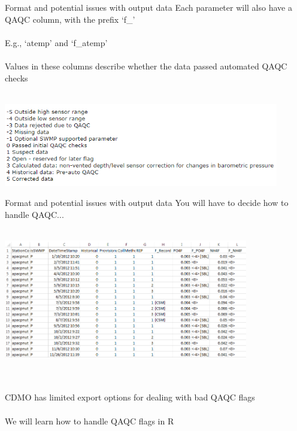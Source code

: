 \documentclass[xcolor=svgnames]{beamer}\usepackage[]{graphicx}\usepackage[]{color}
\begin{document}
\begin{frame}{Format and potential issues with output data}
Each parameter will also have a QAQC column, with the prefix `f\_' \\~\\
E.g., `atemp' and `f\_atemp' \\~\\
Values in these columns describe whether the data passed automated QAQC checks \\~\\
\centerline{\includegraphics[width = 0.9\textwidth]{qaqc_flags.png}}
\end{frame}

\begin{frame}{Format and potential issues with output data}
You will have to decide how to handle QAQC...\\~\\
\centerline{\includegraphics[width = 0.8\textwidth]{qaqc_ex.png}} \\~\\
CDMO has limited export options for dealing with bad QAQC flags \\~\\
We will learn how to handle QAQC flags in R
\end{frame}
\end{document}
